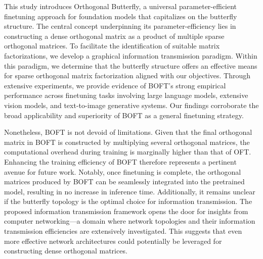 This study introduces Orthogonal Butterfly, a universal parameter-efficient finetuning approach for foundation models that capitalizes on the butterfly structure. The central concept underpinning its parameter-efficiency lies in constructing a dense orthogonal matrix as a product of multiple sparse orthogonal matrices. To facilitate the identification of suitable matrix factorizations, we develop a graphical information transmission paradigm. Within this paradigm, we determine that the butterfly structure offers an effective means for sparse orthogonal matrix factorization aligned with our objectives. Through extensive experiments, we provide evidence of BOFT’s strong empirical performance across finetuning tasks involving large language models, extensive vision models, and text-to-image generative systems. Our findings corroborate the broad applicability and superiority of BOFT as a general finetuning strategy.

Nonetheless, BOFT is not devoid of limitations. Given that the final orthogonal matrix in BOFT is constructed by multiplying several orthogonal matrices, the computational overhead during training is marginally higher than that of OFT. Enhancing the training efficiency of BOFT therefore represents a pertinent avenue for future work. Notably, once finetuning is complete, the orthogonal matrices produced by BOFT can be seamlessly integrated into the pretrained model, resulting in no increase in inference time. Additionally, it remains unclear if the butterfly topology is the optimal choice for information transmission. The proposed information transmission framework opens the door for insights from computer networking—a domain where network topologies and their information transmission efficiencies are extensively investigated. This suggests that even more effective network architectures could potentially be leveraged for constructing dense orthogonal matrices.